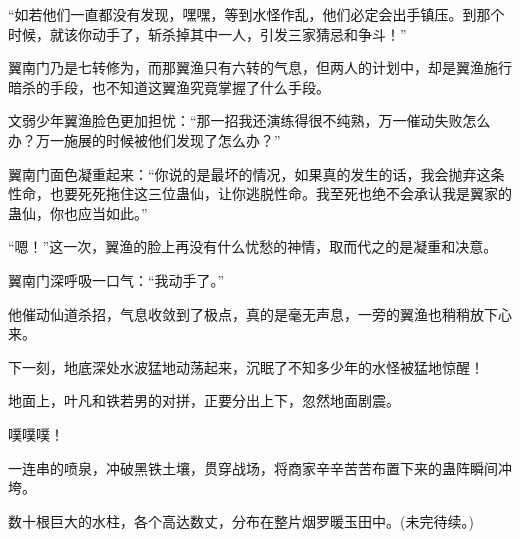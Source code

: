 \begin{this_body}
“如若他们一直都没有发现，嘿嘿，等到水怪作乱，他们必定会出手镇压。到那个时候，就该你动手了，斩杀掉其中一人，引发三家猜忌和争斗！”

翼南门乃是七转修为，而那翼渔只有六转的气息，但两人的计划中，却是翼渔施行暗杀的手段，也不知道这翼渔究竟掌握了什么手段。

文弱少年翼渔脸色更加担忧：“那一招我还演练得很不纯熟，万一催动失败怎么办？万一施展的时候被他们发现了怎么办？”

翼南门面色凝重起来：“你说的是最坏的情况，如果真的发生的话，我会抛弃这条性命，也要死死拖住这三位蛊仙，让你逃脱性命。我至死也绝不会承认我是翼家的蛊仙，你也应当如此。”

“嗯！”这一次，翼渔的脸上再没有什么忧愁的神情，取而代之的是凝重和决意。

翼南门深呼吸一口气：“我动手了。”

他催动仙道杀招，气息收敛到了极点，真的是毫无声息，一旁的翼渔也稍稍放下心来。

下一刻，地底深处水波猛地动荡起来，沉眠了不知多少年的水怪被猛地惊醒！

地面上，叶凡和铁若男的对拼，正要分出上下，忽然地面剧震。

噗噗噗！

一连串的喷泉，冲破黑铁土壤，贯穿战场，将商家辛辛苦苦布置下来的蛊阵瞬间冲垮。

数十根巨大的水柱，各个高达数丈，分布在整片烟罗暖玉田中。(未完待续。)

\end{this_body}

